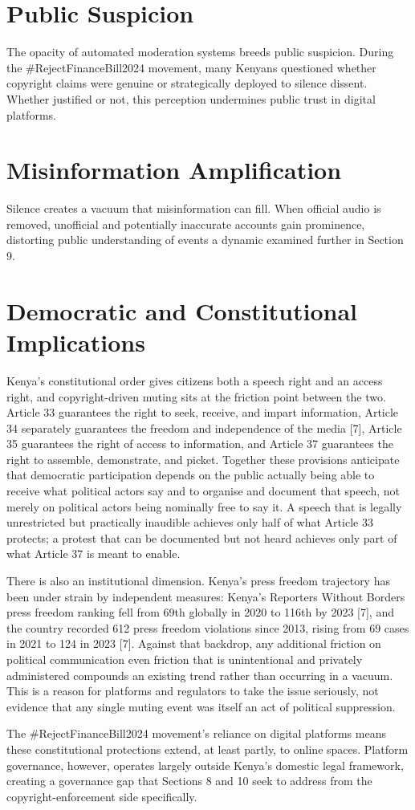 \documentclass{article}
\begin{document}
\section{Public Suspicion}
\par 
The opacity of automated moderation systems breeds public suspicion. During the \#RejectFinanceBill2024 movement, many Kenyans questioned whether copyright claims were genuine or strategically deployed to silence dissent. Whether justified or not, this perception undermines public trust in digital platforms.

\section{Misinformation Amplification}
\par 
Silence creates a vacuum that misinformation can fill. When official audio is removed, unofficial and potentially inaccurate accounts gain prominence, distorting public understanding of events a dynamic examined further in Section 9.
\section{Democratic and Constitutional Implications}
\par 
Kenya’s constitutional order gives citizens both a speech right and an access right, and copyright-driven muting sits at the friction point between the two. Article 33 guarantees the right to seek, receive, and impart information, Article 34 separately guarantees the freedom and independence of the media [7], Article 35 guarantees the right of access to information, and Article 37 guarantees the right to assemble, demonstrate, and picket. Together these provisions anticipate that democratic participation depends on the public actually being able to receive what political actors say and to organise and document that speech, not merely on political actors being nominally free to say it. A speech that is legally unrestricted but practically inaudible achieves only half of what Article 33 protects; a protest that can be documented but not heard achieves only part of what Article 37 is meant to enable.
\par 
There is also an institutional dimension. Kenya’s press freedom trajectory has been under strain by independent measures: Kenya’s Reporters Without Borders press freedom ranking fell from 69th globally in 2020 to 116th by 2023 [7], and the country recorded 612 press freedom violations since 2013, rising from 69 cases in 2021 to 124 in 2023 [7]. Against that backdrop, any additional friction on political communication even friction that is unintentional and privately administered compounds an existing trend rather than occurring in a vacuum. This is a reason for platforms and regulators to take the issue seriously, not evidence that any single muting event was itself an act of political suppression.
\par
The \#RejectFinanceBill2024 movement’s reliance on digital platforms means these constitutional protections extend, at least partly, to online spaces. Platform governance, however, operates largely outside Kenya’s domestic legal framework, creating a governance gap that Sections 8 and 10 seek to address from the copyright-enforcement side specifically.
\end{document}
